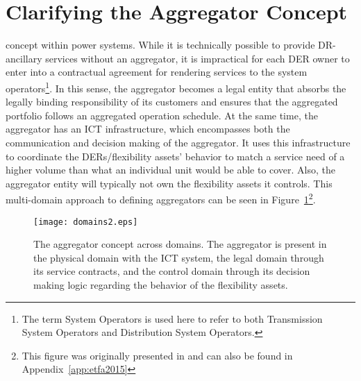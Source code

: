 \section{Clarifying the Aggregator Concept}
 concept within power systems. While it is technically possible to provide DR-ancillary services without an aggregator, it is impractical for each DER owner to enter into a contractual agreement for rendering services to the system operators\footnote{The term System Operators is used here to refer to both Transmission System Operators and Distribution System Operators.}. In this sense, the aggregator becomes a legal entity that absorbs the legally binding responsibility of its customers and ensures that the aggregated portfolio follows an aggregated operation schedule. At the same time, the aggregator has an ICT infrastructure, which encompasses both the communication and decision making of the aggregator. It uses this infrastructure to coordinate the DERs/flexibility assets' behavior to match a service need of a higher volume than what an individual unit would be able to cover. Also, the aggregator entity will typically not own the flexibility assets it controls. This multi-domain approach to defining aggregators can be seen in Figure~\ref{fig:MAINdomains}\footnote{This figure was originally presented in \cite{bondy2015a} and can also be found in Appendix~\ref{app:etfa2015}}.

\begin{figure}[htbp!]
\centering
\texttt{[image: domains2.eps]}
\caption{The aggregator concept across domains. The aggregator is present in the physical domain with the ICT system, the legal domain through its service contracts, and the control domain through its decision making logic regarding the behavior of the flexibility assets.}
\label{fig:MAINdomains}
\end{figure}

